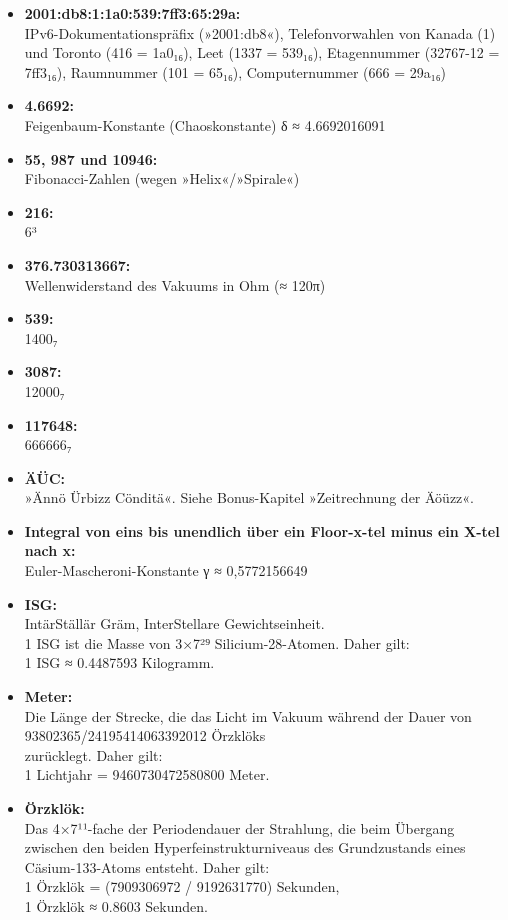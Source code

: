 \begin{itemize}
    \item \textbf{2001:db8:1:1a0:539:7ff3:65:29a:}\\ IPv6-Dokumentationspräfix (»2001:db8«), Telefonvorwahlen von Kanada (1) und Toronto (416 = 1a0₁₆), Leet (1337 = 539₁₆), Etagennummer (32767-12 = 7ff3₁₆), Raumnummer (101 = 65₁₆), Computernummer (666 = 29a₁₆)
    \item \textbf{4.6692:}\\ Feigenbaum-Konstante (Chaoskonstante) δ ≈ 4.6692016091
    \item \textbf{55, 987 und 10946:}\\ Fibonacci-Zahlen (wegen »Helix«/»Spirale«)
    \item \textbf{216:}\\ 6³
    \item \textbf{376.730313667:}\\ Wellenwiderstand des Vakuums in Ohm (≈ 120π)
    \item \textbf{539:}\\ 1400₇
    \item \textbf{3087:}\\ 12000₇
    \item \textbf{117648:}\\ 666666₇
    \item \textbf{ÄÜC:}\\ »Ännö Ürbizz Cönditä«. Siehe Bonus-Kapitel »Zeitrechnung der Äöüzz«.
    \item \textbf{Integral von eins bis unendlich über ein Floor-x-tel minus ein X-tel nach x:}\\ Euler-Mascheroni-Konstante γ ≈ 0,5772156649
    \item \textbf{ISG:}\\ IntärStällär Gräm, InterStellare Gewichtseinheit.\\ 1 ISG ist die Masse von 3×7²⁹ Silicium-28-Atomen. Daher gilt:\\ 1 ISG ≈ 0.4487593 Kilogramm.
    \item \textbf{Meter:}\\ Die Länge der Strecke, die das Licht im Vakuum während der Dauer von\\ 93802365/24195414063392012 Örzklöks\\ zurücklegt. Daher gilt:\\ 1 Lichtjahr = 9460730472580800 Meter.
    \item \textbf{Örzklök:}\\ Das 4×7¹¹-fache der Periodendauer der Strahlung, die beim Übergang zwischen den beiden Hyperfeinstrukturniveaus des Grundzustands eines Cäsium-133-Atoms entsteht. Daher gilt:\\ 1 Örzklök = (7909306972 / 9192631770) Sekunden,\\1 Örzklök ≈ 0.8603 Sekunden.

\end{itemize}
